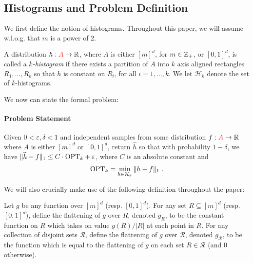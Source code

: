\documentclass[final,12pt]{colt2018} %
\newcommand{\flatten}[1]{\overline{#1}}
\newcommand{\eps}{\varepsilon}
\newcommand{\calH}{\mathcal{H}}
\newcommand{\hhat}{\widehat{h}}
\newcommand{\new}[1]{{\color{red} #1}}
\newcommand{\new}[1]{{#1}}
\begin{document}
\subsection{Histograms and Problem Definition}
We first define the notion of histograms.
Throughout this paper, we will assume w.l.o.g. that $m$ is a power of $2$.
\begin{definition}
A distribution $h: \new{A} \to \R$, \new{where $A$ is either $[m]^d$, for $m \in \operatorname{\mathbb{Z}}_+$, or $[0, 1]^d$,}
is called a \emph{$k$-histogram} if there exists a partition of \new{$A$} 
into $k$ axis aligned rectangles $R_1, \ldots, R_k$ so that $h$ is constant on $R_i$, for all $i = 1,\ldots, k$.
We let $\calH_k$ denote the set of $k$-histograms.
\end{definition}

\noindent
We now can state the formal problem:
\paragraph{Problem Statement} Given $0< \eps, \delta <1$ and independent samples 
from some distribution $f: \new{A} \to \R$ \new{where $A$ is either $[m]^d$ or $[0, 1]^d$}, return $\hhat$ so that 
with probability $1 - \delta$, we have $\| \hhat - f \|_1 \leq C \cdot \OPT_k + \eps$, 
where $C$ is an absolute constant and
\[
\OPT_k = \min_{h \in \calH_k} \| h - f \|_1 \; .
\]

\noindent
We will also crucially make use of the following definition throughout the paper:
\begin{definition}
Let $g$ be any function over $[m]^d$ (resp. $[0, 1]^d$).
For any set $R \subseteq [m]^d$ (resp. $[0, 1]^d$), define the flattening of $g$ over $R$, 
denoted $\flatten{g}_R$, to be the constant function on $R$ which takes on value $g(R) / |R|$ at each point in $R$.
For any collection of disjoint sets $\mathcal{R}$, define the flattening of $g$ over $\mathcal{R}$, 
denoted $\flatten{g}_\mathcal{R}$, to be the function which is equal to the flattening of $g$ on each set $R \in \mathcal{R}$ (and $0$ otherwise).
\end{definition}
\end{document}
